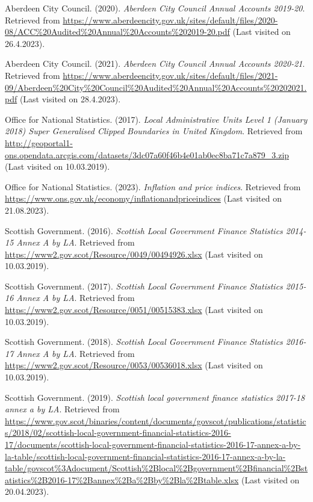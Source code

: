 \documentclass[
  12pt,
]{article}
\newlength{\cslhangindent}
\newlength{\cslentryspacingunit} %
\newenvironment{CSLReferences}[2] %
 {%
  \setlength{\parindent}{0pt}
  \ifodd #1
  \let\oldpar\par
  \def\par{\hangindent=\cslhangindent\oldpar}
  \fi
  \setlength{\parskip}{#2\cslentryspacingunit}
 }%
 {}
\begin{document}
\hypertarget{refs}{}
\begin{CSLReferences}{1}{0}
\leavevmode{}%
Aberdeen City Council. (2020). \emph{{Aberdeen City Council Annual Accounts 2019-20}}. Retrieved from \url{https://www.aberdeencity.gov.uk/sites/default/files/2020-08/ACC\%20Audited\%20Annual\%20Accounts\%202019-20.pdf} (Last visited on 26.4.2023).

\leavevmode{}%
Aberdeen City Council. (2021). \emph{{Aberdeen City Council Annual Accounts 2020-21}}. Retrieved from \url{https://www.aberdeencity.gov.uk/sites/default/files/2021-09/Aberdeen\%20City\%20Council\%20Audited\%20Annual\%20Accounts\%20202021.pdf} (Last visited on 28.4.2023).

\leavevmode{}%
Office for National Statistics. (2017). \emph{{Local Administrative Units Level 1 (January 2018) Super Generalised Clipped Boundaries in United Kingdom}}. Retrieved from \url{http://geoportal1-ons.opendata.arcgis.com/datasets/3dc07a60f46b4e01ab0ec8ba71c7a879_3.zip} (Last visited on 10.03.2019).

\leavevmode{}%
Office for National Statistics. (2023). \emph{{Inflation and price indices}}. Retrieved from \url{https://www.ons.gov.uk/economy/inflationandpriceindices} (Last visited on 21.08.2023).

\leavevmode{}%
Scottish Government. (2016). \emph{{Scottish Local Government Finance Statistics 2014-15 Annex A by LA}}. Retrieved from \url{https://www2.gov.scot/Resource/0049/00494926.xlsx} (Last visited on 10.03.2019).

\leavevmode{}%
Scottish Government. (2017). \emph{{Scottish Local Government Finance Statistics 2015-16 Annex A by LA}}. Retrieved from \url{https://www2.gov.scot/Resource/0051/00515383.xlsx} (Last visited on 10.03.2019).

\leavevmode{}%
Scottish Government. (2018). \emph{{Scottish Local Government Finance Statistics 2016-17 Annex A by LA}}. Retrieved from \url{https://www2.gov.scot/Resource/0053/00536018.xlsx} (Last visited on 10.03.2019).

\leavevmode{}%
Scottish Government. (2019). \emph{Scottish local government finance statistics 2017-18 annex a by LA}. Retrieved from \url{https://www.gov.scot/binaries/content/documents/govscot/publications/statistics/2018/02/scottish-local-government-financial-statistics-2016-17/documents/scottish-local-government-financial-statistics-2016-17-annex-a-by-la-table/scottish-local-government-financial-statistics-2016-17-annex-a-by-la-table/govscot\%3Adocument/Scottish\%2Blocal\%2Bgovernment\%2Bfinancial\%2Bstatistics\%2B2016-17\%2Bannex\%2Ba\%2Bby\%2Bla\%2Btable.xlsx} (Last visited on 20.04.2023).


\end{CSLReferences}
\end{document}
